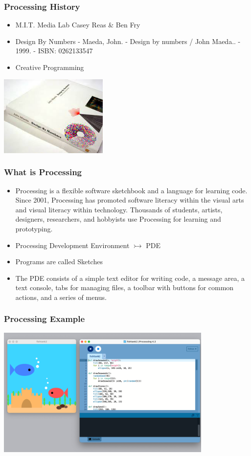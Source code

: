 \documentclass[10pt]{beamer}
\begin{document}
\begin{frame}
   \frametitle{Processing History}
   	\begin{itemize}
	\item M.I.T. Media Lab Casey Reas \& Ben Fry
	\item Design By Numbers  - Maeda, John. - Design by numbers / John Maeda.. - 1999. - ISBN: 0262133547
	\item Creative Programming
	\end{itemize}
	 \hspace{8 em}
   \includegraphics[height=4cm]{images/design}
\end{frame}


\begin{frame}
   \frametitle{What is Processing}
   \begin{itemize}
   \item {Processing is a flexible software sketchbook and a language for learning code. Since 2001, Processing has promoted software literacy within the visual arts and visual literacy within technology. Thousands of students, artists, designers, researchers, and hobbyists use Processing for learning and prototyping.}
   \item{Processing Development Environment $\rightarrowtail$ PDE}
   \item{Programs are called Sketches}
   \item{The PDE consists of a simple text editor for writing code, a message area, a text console, tabs for managing files, a toolbar with buttons for common actions, and a series of menus.}
\end{itemize}	
\end{frame}

\begin{frame}
  \frametitle{Processing Example}
  \vspace{3mm}
  \includegraphics[width=0.8\textwidth]{images/python04}
\end{frame}
\end{document}
